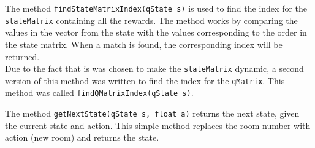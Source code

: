 \documentclass[../Head/Main.tex]{subfiles}
\begin{document}
The method \texttt{findStateMatrixIndex(qState s)} is used to find the index for the \texttt{stateMatrix} containing all the rewards. The method works by comparing the values in the vector from the state with the values corresponding to the order in the state matrix. When a match is found, the corresponding index will be returned.\\
Due to the fact that is was chosen to make the \texttt{stateMatrix} dynamic, a second version of this method was written to find the index for the \texttt{qMatrix}. This method was called \texttt{findQMatrixIndex(qState s)}.\par 

The method \texttt{getNextState(qState s, float a)} returns the next state, given the current state and action. This simple method replaces the room number with action (new room) and returns the state.\par 
\end{document}
